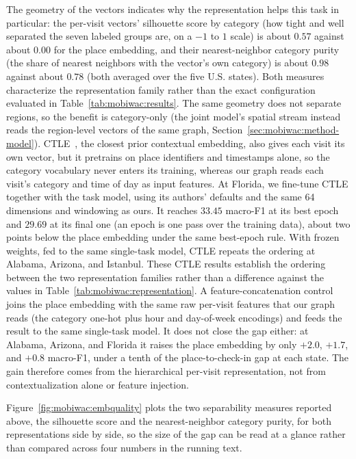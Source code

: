 The geometry of the vectors indicates why the representation helps this task in
particular: the per-visit vectors' silhouette score by category (how tight and well separated the seven labeled groups are, on a $-1$ to $1$ scale) is about $0.57$ against about $0.00$ for the place embedding, and their nearest-neighbor category purity (the share of nearest neighbors with the vector's own category) is about $0.98$ against about $0.78$ (both averaged over the five U.S. states). Both measures characterize the representation family rather than the exact configuration
evaluated in Table~\ref{tab:mobiwac:results}. The same geometry does not separate regions, so the benefit is category-only (the joint model's spatial stream instead reads the region-level vectors of the same graph, Section~\ref{sec:mobiwac:method-model}). CTLE~\cite{lin2021ctle}, the closest prior contextual embedding, also gives each visit its own vector, but it pretrains on place identifiers and timestamps alone, so the category vocabulary never enters its training, whereas our graph reads each visit's category and time of day as input features. At Florida, we fine-tune CTLE together with the task model, using its authors' defaults and the same 64 dimensions and windowing as ours. It reaches $33.45$ macro-F1 at its best epoch and $29.69$ at its final one (an epoch is one pass over the training data), about two points below the place embedding under the same best-epoch rule. With frozen weights, fed to the same single-task model, CTLE repeats the ordering at Alabama, Arizona, and Istanbul. These CTLE results establish the ordering between the two representation families rather than a
difference against the values in Table~\ref{tab:mobiwac:representation}. A feature-concatenation control joins the place embedding with the same raw
per-visit features that our graph reads (the category one-hot plus hour and
day-of-week encodings) and feeds the result to the same single-task model. It
does not close the gap either: at Alabama, Arizona, and Florida it raises the
place embedding by only $+2.0$, $+1.7$, and $+0.8$ macro-F1, under a tenth of
the place-to-check-in gap at each state. The gain therefore comes from
the hierarchical per-visit representation, not from contextualization alone or
feature injection.

\providecommand{\sd}[1]{\,{\scriptsize$\pm$#1}}


Figure~\ref{fig:mobiwac:embquality} plots the two separability measures reported above, the
silhouette score and the nearest-neighbor category purity, for both representations side by
side, so the size of the gap can be read at a glance rather than compared across four numbers
in the running text.


